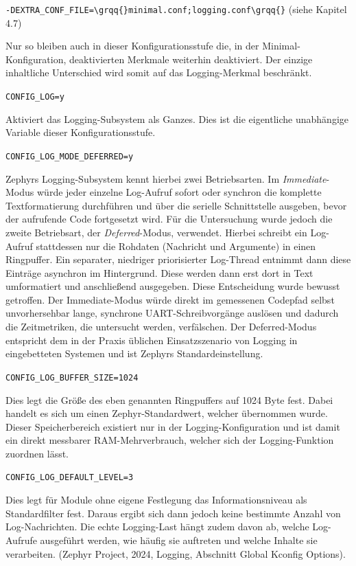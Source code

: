 \lstinline[style=codeinline]|-DEXTRA_CONF_FILE=\grqq{}minimal.conf;logging.conf\grqq{}| (siehe Kapitel 4.7)

Nur so bleiben auch in dieser Konfigurationsstufe die, in der Minimal-Konfiguration, deaktivierten Merkmale weiterhin deaktiviert. Der einzige inhaltliche Unterschied wird somit auf das Logging-Merkmal beschr{\"a}nkt.

\lstinline[style=codeinline]|CONFIG_LOG=y|

Aktiviert das Logging-Subsystem als Ganzes. Dies ist die eigentliche unabh{\"a}ngige Variable dieser Konfigurationsstufe.

\lstinline[style=codeinline]|CONFIG_LOG_MODE_DEFERRED=y|

Zephyrs Logging-Subsystem kennt hierbei zwei Betriebsarten. Im \emph{Immediate}-Modus w{\"u}rde jeder einzelne Log-Aufruf sofort oder synchron die komplette Textformatierung durchf{\"u}hren und {\"u}ber die serielle Schnittstelle ausgeben, bevor der aufrufende Code fortgesetzt wird. F{\"u}r die Untersuchung wurde jedoch die zweite Betriebsart, der \emph{Deferred}-Modus, verwendet. Hierbei schreibt ein Log-Aufruf stattdessen nur die Rohdaten (Nachricht und Argumente) in einen Ringpuffer. Ein separater, niedriger priorisierter Log-Thread entnimmt dann diese Eintr{\"a}ge asynchron im Hintergrund. Diese werden dann erst dort in Text umformatiert und anschlie{\ss}end ausgegeben. Diese Entscheidung wurde bewusst getroffen. Der Immediate-Modus w{\"u}rde direkt im gemessenen Codepfad selbst unvorhersehbar lange, synchrone UART-Schreibvorg{\"a}nge ausl{\"o}sen und dadurch die Zeitmetriken, die untersucht werden, verf{\"a}lschen. Der Deferred-Modus entspricht dem in der Praxis {\"u}blichen Einsatzszenario von Logging in eingebetteten Systemen und ist Zephyrs Standardeinstellung.

\lstinline[style=codeinline]|CONFIG_LOG_BUFFER_SIZE=1024|

Dies legt die Gr{\"o}{\ss}e des eben genannten Ringpuffers auf 1024 Byte fest. Dabei handelt es sich um einen Zephyr-Standardwert, welcher {\"u}bernommen wurde. Dieser Speicherbereich existiert nur in der Logging-Konfiguration und ist damit ein direkt messbarer RAM-Mehrverbrauch, welcher sich der Logging-Funktion zuordnen l{\"a}sst.

\lstinline[style=codeinline]|CONFIG_LOG_DEFAULT_LEVEL=3|

Dies legt f{\"u}r Module ohne eigene Festlegung das Informationsniveau als Standardfilter fest. Daraus ergibt sich dann jedoch keine bestimmte Anzahl von Log-Nachrichten. Die echte Logging-Last h{\"a}ngt zudem davon ab, welche Log-Aufrufe ausgef{\"u}hrt werden, wie h{\"a}ufig sie auftreten und welche Inhalte sie verarbeiten.  (Zephyr Project, 2024, \glqq{}Logging\grqq{}, Abschnitt \glqq{}Global Kconfig Options\grqq{}).

